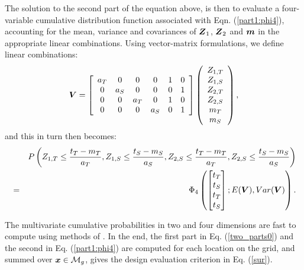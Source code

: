 \documentclass[aoas]{imsart}
\begin{document}
The solution to the second part of the equation above, is then to
evaluate a four-variable cumulative distribution function associated
with Eqn. (\ref{part1:phi4}), accounting for the mean, variance and
covariances of ${\boldsymbol Z}_1$, ${\boldsymbol Z}_2$ and ${\boldsymbol m}$ in the appropriate linear
combinations. Using vector-matrix formulations, we define linear
combinations:
\begin{equation}\label{Vcomb}
    \bV=\left[
    \begin{array}{cccccc}
        a_T & 0 & 0 & 0 & 1 & 0 \\
         0 & a_S & 0 & 0 & 0 & 1 \\
         0 & 0 & a_T & 0 & 1 & 0\\
         0 & 0 & 0 & a_S & 0 & 1\\
    \end{array}
    \right] 
    \left(
    \begin{array}{cccccc}
         Z_{1,T} \\
         Z_{1,S} \\
         Z_{2,T} \\
         Z_{2,S} \\
         m_{T} \\
         m_{S}
    \end{array}
    \right),
\end{equation}
and this in turn then becomes:
\begin{eqnarray}\label{part1:phi4_2}
&& P \left( Z_{1,T} \leq \frac{t_T-m_{T}}{a_{T}}, 
Z_{1,S} \leq \frac{t_S-m_{S}}{a_{S}},Z_{2,S} \leq \frac{t_T-m_{T}}{a_{T}}, 
Z_{2,S} \leq \frac{t_S-m_{S}}{a_{S}} \right)  \\
&=&  \Phi_4 
\begin{pmatrix} 
\begin{bmatrix} t_T\\
t_S \\
t_T \\
t_S
\end{bmatrix};
E( \bV),Var(\bV)
\end{pmatrix} \nonumber.
\end{eqnarray}

The multivariate cumulative probabilities in two and four dimensions
are fast to compute using methods of \cite{genz2009computation}.  In
the end, the first part in Eq. (\ref{two_parts0}) and the second in
Eq. (\ref{part1:phi4}) are computed for each location on the grid, and
summed over ${\boldsymbol x} \in \mathcal{M}_g$, gives the design evaluation
criterion in Eq. (\ref{sur}). 
\end{document}
